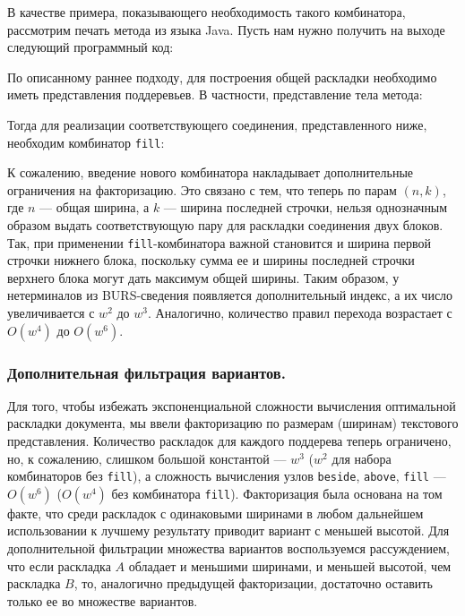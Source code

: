 В качестве примера, показывающего необходимость такого комбинатора, рассмотрим
печать метода из языка Java. Пусть нам нужно получить на выходе следующий программный
код:



По описанному раннее подходу, для построения общей раскладки необходимо иметь представления
поддеревьев. В частности, представление тела метода:



Тогда для реализации соответствующего соединения, представленного ниже,
необходим комбинатор \lstinline{fill}:



К сожалению, введение нового комбинатора накладывает дополнительные ограничения на
факторизацию. Это связано с тем, что теперь по парам $(n, k)$, где $n$ --- общая ширина,
а $k$ --- ширина последней строчки, нельзя однозначным образом выдать соответствующую
пару для раскладки соединения двух блоков. Так, при применении \lstinline{fill}-комбинатора
важной становится и ширина первой строчки нижнего блока, поскольку сумма ее и ширины
последней строчки верхнего блока могут дать максимум общей ширины. Таким образом,
у нетерминалов из BURS-сведения появляется дополнительный индекс, а их число
увеличивается с $w^2$ до $w^3$. Аналогично, количество правил перехода возрастает
с $O(w^4)$ до $O(w^6)$.

\subsubsection{Дополнительная фильтрация вариантов.}

Для того, чтобы избежать экспоненциальной сложности вычисления оптимальной
раскладки документа, мы ввели факторизацию по размерам (ширинам) текстового
представления.
Количество раскладок для каждого поддерева теперь ограничено, но, к сожалению,
слишком большой константой --- $w^3$ ($w^2$ для набора комбинаторов без
\lstinline{fill}), а сложность вычисления узлов
\lstinline{beside}, \lstinline{above}, \lstinline{fill} --- $O(w^6)$
($O(w^4)$ без комбинатора \lstinline{fill}). Факторизация была основана на том факте, что
среди раскладок с одинаковыми ширинами в любом дальнейшем использовании
к лучшему результату приводит вариант с меньшей высотой.
Для дополнительной фильтрации множества
вариантов воспользуемся рассуждением, что если раскладка $A$ обладает и
меньшими ширинами, и меньшей высотой, чем раскладка $B$, то, аналогично
предыдущей факторизации,
достаточно оставить только ее во множестве вариантов.

